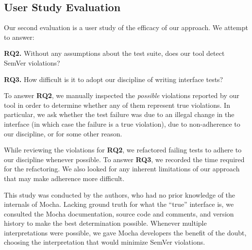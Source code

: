 \subsection{User Study Evaluation}
Our second evaluation is a user study of the efficacy of our
approach. We attempt to answer: 

{\bf RQ2.} Without any assumptions about the test suite, does our tool
detect SemVer violations?

{\bf RQ3.} How difficult is it to adopt our discipline of writing interface
tests?

To answer {\bf RQ2}, we manually inspected the {\em possible} 
violations reported by our tool in order to determine whether any of
them represent true violations. In particular, we ask whether the test
failure was due to an illegal change in the interface (in which case
the failure is a true violation), due to non-adherence to our
discipline, or for some other reason.

While reviewing the violations for {\bf RQ2}, we refactored failing
tests to adhere to our discipline whenever possible. To answer {\bf
  RQ3}, we recorded the time required for the refactoring. We also
looked for any inherent limitations of our approach that may make
adherence more difficult.

This study was conducted by the authors, who had no prior knowledge of
the internals of Mocha. Lacking ground truth for what the ``true''
interface is, we consulted the Mocha documentation, source code and
comments, and version history to make the best determination
possible. Whenever multiple interpretations were possible, we gave
Mocha developers the benefit of the doubt, choosing the interpretation
that would minimize SemVer violations.


